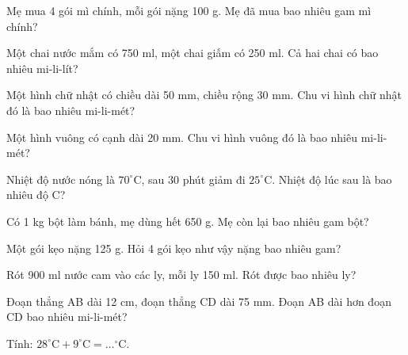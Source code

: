 \begin{ex}
Mẹ mua 4 gói mì chính, mỗi gói nặng 100 g. Mẹ đã mua bao nhiêu gam mì chính?
\end{ex}

\begin{ex}
Một chai nước mắm có 750 ml, một chai giấm có 250 ml. Cả hai chai có bao nhiêu mi-li-lít?
\end{ex}

\begin{ex}
Một hình chữ nhật có chiều dài 50 mm, chiều rộng 30 mm. Chu vi hình chữ nhật đó là bao nhiêu mi-li-mét?
\end{ex}

\begin{ex}
Một hình vuông có cạnh dài 20 mm. Chu vi hình vuông đó là bao nhiêu mi-li-mét?
\end{ex}

\begin{ex}
Nhiệt độ nước nóng là $70^\circ$C, sau 30 phút giảm đi $25^\circ$C. Nhiệt độ lúc sau là bao nhiêu độ C?
\end{ex}

\begin{ex}
Có 1 kg bột làm bánh, mẹ dùng hết 650 g. Mẹ còn lại bao nhiêu gam bột?
\end{ex}

\begin{ex}
Một gói kẹo nặng 125 g. Hỏi 4 gói kẹo như vậy nặng bao nhiêu gam?
\end{ex}

\begin{ex}
Rót 900 ml nước cam vào các ly, mỗi ly 150 ml. Rót được bao nhiêu ly?
\end{ex}

\begin{ex}
Đoạn thẳng AB dài 12 cm, đoạn thẳng CD dài 75 mm. Đoạn AB dài hơn đoạn CD bao nhiêu mi-li-mét?
\end{ex}

\begin{ex}
Tính: $28^\circ\text{C} + 9^\circ\text{C} = \dots^\circ\text{C}$.
\end{ex}

